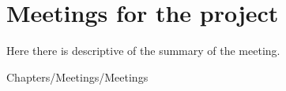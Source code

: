 \chapter{Meetings for the project}

Here there is descriptive of the summary of the meeting. 

{Chapters/Meetings/Meetings} 